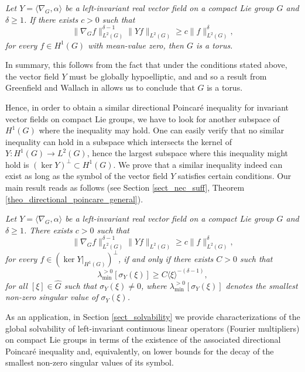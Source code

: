 \documentclass[11pt]{amsart}
\numberwithin{theorem}{section}
\numberwithin{equation}{section}
\theoremstyle{definition}
\numberwithin{example}{section}
\theoremstyle{definition}
\theoremstyle{definition}
\begin{document}
\emph{  Let $Y=\langle \nabla_{G},\alpha\rangle$ be a left-invariant real vector field on a compact Lie group $G$ and $\delta\geq 1$. If there exists $c>0$ such that 
    \begin{equation*}
        \|\nabla_{G} f\|_{L^2(G)}^{\delta-1}\| Yf\|_{L^2(G)}\geq c\|f\|_{L^2(G)}^\delta,
    \end{equation*}
    for every $f\in H^1(G)$ with mean-value zero, then $G$ is a torus.
}

 In summary, this follows from the fact that under the conditions stated above, 
 the vector field $Y$ must be globally hypoelliptic, and 
 and so a result from Greenfield and Wallach in  \cite{GW_GH_vector_fields} 
 allows us to conclude that $G$ is a torus.

Hence, in order to obtain a similar  directional Poincaré inequality for invariant vector fields on compact Lie groups, we have to look for another subspace of $H^1(G)$ where the inequality may hold. One can easily verify that no similar inequality can hold in a subspace which intersects the kernel of $Y:H^1(G)\to L^2(G)$, hence the largest subspace where this inequality might hold is $(\ker Y)^\perp\subset H^1(G)$. We prove that a similar inequality indeed can exist as long as the symbol of the vector field $Y$ satisfies certain conditions. Our main result reads as follows (see Section \ref{sect_nec_suff}, Theorem \ref{theo_directional_poincare_general}).

\emph{
    Let $Y=\langle \nabla_{G},\alpha\rangle$ be a left-invariant real vector field on a compact Lie group $G$ and $\delta\geq 1$. There exists $c>0$ such that 
\begin{equation*}
        \|\nabla_{G} f\|_{L^2(G)}^{\delta-1}\| Yf\|_{L^2(G)}\geq c\|f\|_{L^2(G)}^\delta,
    \end{equation*}
    for every $f\in (\ker Y|_{H^1(G)})^\perp$, if and only if there exists $C>0$ such that
\begin{equation*}
        \lambda_{\min}^{>0}[\sigma_Y(\xi)]\geq C\langle \xi \rangle^{-(\delta-1)},
    \end{equation*}
    for all $[\xi]\in\widehat{G}$ such that $\sigma_Y(\xi)\neq 0$, where $\lambda_{\min}^{>0}[\sigma_{Y}(\xi)]$ denotes the smallest non-zero  singular value of $\sigma_Y(\xi)$.
}


As an application, in Section \ref{sect_solvability} we provide characterizations of the global solvability of left-invariant continuous linear operators (Fourier multipliers) on compact Lie groups in terms of the existence of the associated directional Poincaré inequality and, equivalently, on lower bounds for the decay of the smallest non-zero singular values of its symbol.
\end{document}
